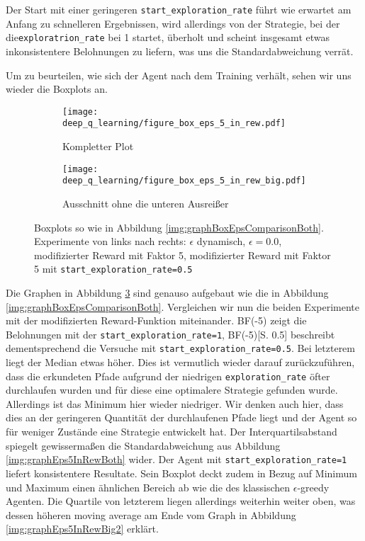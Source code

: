 Der Start mit einer geringeren \texttt{start_exploration_rate} führt wie erwartet am Anfang zu schnelleren Ergebnissen, wird allerdings von der Strategie, bei der die\linebreak\texttt{exploratrion_rate} bei 1 startet, überholt und scheint insgesamt etwas inkonsistentere Belohnungen zu liefern, was uns die Standardabweichung verrät.

Um zu beurteilen, wie sich der Agent nach dem Training verhält, sehen wir uns wieder die Boxplots an.

\begin{figure}[h!]
    \centering
    \begin{subfigure}[b]{0.7\textwidth}
        \texttt{[image: deep\_q\_learning/figure\_box\_eps\_5\_in\_rew.pdf]}
        \caption{Kompletter Plot}
        \label{img:graphBoxEps5InRew}
    \end{subfigure}
    \begin{subfigure}[b]{0.7\textwidth}
        \texttt{[image: deep\_q\_learning/figure\_box\_eps\_5\_in\_rew\_big.pdf]}
        \caption{Ausschnitt ohne die unteren Ausreißer}
        \label{img:graphBoxEps5InRewBig}
    \end{subfigure}
    \caption{Boxplots so wie in Abbildung \ref{img:graphBoxEpsComparisonBoth}. Experimente von links nach rechts: $ \epsilon $ dynamisch, $ \epsilon = 0.0 $, modifizierter Reward mit Faktor 5, modifizierter Reward mit Faktor 5 mit \texttt{start_exploration_rate=0.5}}
    \label{img:graphBoxEps5InRewBoth}
\end{figure}

Die Graphen in Abbildung \ref{img:graphBoxEps5InRewBoth} sind genauso aufgebaut wie die in Abbildung \ref{img:graphBoxEpsComparisonBoth}. Vergleichen wir nun die beiden Experimente mit der modifizierten Reward-Funktion miteinander. BF(-5) zeigt die Belohnungen mit der \texttt{start_exploration_rate=1}, BF(-5)[S. 0.5] beschreibt dementsprechend die Versuche mit \texttt{start_exploration_rate=0.5}. Bei letzterem liegt der Median etwas höher. Dies ist vermutlich wieder darauf zurückzuführen, dass die erkundeten Pfade aufgrund der niedrigen \texttt{exploration_rate} öfter durchlaufen wurden und für diese eine optimalere Strategie gefunden wurde. Allerdings ist das Minimum hier wieder niedriger. Wir denken auch hier, dass dies an der geringeren Quantität der durchlaufenen Pfade liegt und der Agent so für weniger Zustände eine Strategie entwickelt hat. Der Interquartilsabstand spiegelt gewissermaßen die Standardabweichung aus Abbildung \ref{img:graphEps5InRewBoth} wider. Der Agent mit \texttt{start_exploration_rate=1} liefert konsistentere Resultate. Sein Boxplot deckt zudem in Bezug auf Minimum und Maximum einen ähnlichen Bereich ab wie die des klassischen $ \epsilon $-greedy Agenten. Die Quartile von letzterem liegen allerdings weiterhin weiter oben, was dessen höheren moving average am Ende vom Graph in Abbildung \ref{img:graphEps5InRewBig2} erklärt.


